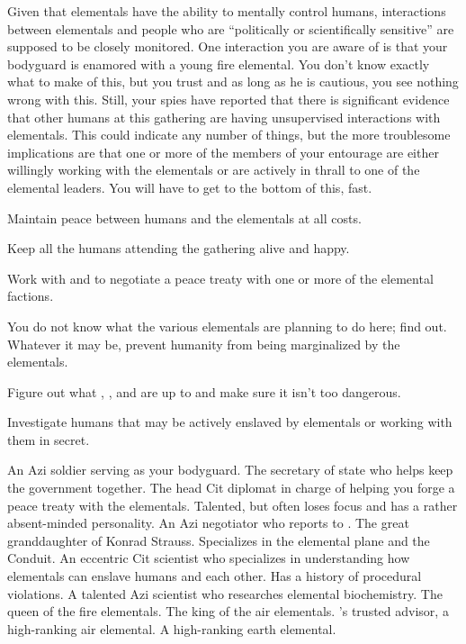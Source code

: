 \documentclass[char]{elementals}
\begin{document}
Given that elementals have the ability to mentally control humans, interactions between elementals and people who are ``politically or scientifically sensitive'' are supposed to be closely monitored. One interaction you are aware of is that your bodyguard \cRomeo{} is enamored with a young fire elemental. You don't know exactly what to make of this, but you trust \cRomeo{} and as long as he is cautious, you see nothing wrong with this. Still, your spies have reported that there is significant evidence that other humans at this gathering are having unsupervised interactions with elementals. This could indicate any number of things, but the more troublesome implications are that one or more of the members of your entourage are either willingly working with the elementals or are actively in thrall to one of the elemental leaders. You will have to get to the bottom of this, fast.



\begin{itemz}[Goals]
  \item Maintain peace between humans and the elementals at all costs.
  \item Keep all the humans attending the gathering alive and happy.
  \item Work with \cAvatar{} and \cDiplomat{} to negotiate a peace treaty with one or more of the elemental factions.
  \item You do not know what the various elementals are planning to do here; find out. Whatever it may be, prevent humanity from being marginalized by the elementals.
  \item Figure out what \cGD{}, \cMS{}, and \cScientist{} are up to and make sure it isn't too dangerous.
  \item Investigate humans that may be actively enslaved by elementals or working with them in secret.
\end{itemz}

\begin{contacts}
  \contact{\cRomeo{}} An Azi soldier serving as your bodyguard.
  \contact{\cDema{}} The secretary of state who helps keep the government together.
	\contact{\cAvatar{}} The head Cit diplomat in charge of helping you forge a peace treaty with the elementals. Talented, but often loses focus and has a rather absent-minded personality.
	\contact{\cDiplomat{}} An Azi negotiator who reports to \cAvatar{}.
	\contact{\cGD{}} The great granddaughter of Konrad Strauss. Specializes in the elemental plane and the Conduit.
	\contact{\cMS{}} An eccentric Cit scientist who specializes in understanding how elementals can enslave humans and each other. Has a history of procedural violations.
	\contact{\cScientist{}} A talented Azi scientist who researches elemental biochemistry.
	\contact{\cQueen{}} The queen of the fire elementals.
	\contact{\cKing{}} The king of the air elementals.
	\contact{\cNaturalist{}} \cKing{}'s trusted advisor, a high-ranking air elemental.
	\contact{\cLoyal{}} A high-ranking earth elemental.
\end{contacts}
\end{document}
